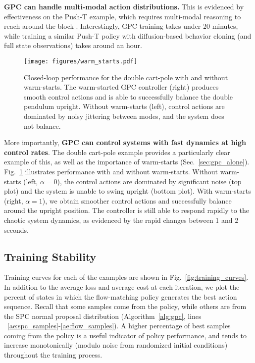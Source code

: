 \documentclass[letterpaper, 10 pt]{ieeeconf}
\begin{document}
\textbf{GPC can handle multi-modal action distributions.} This is evidenced by effectiveness on the Push-T example, which requires multi-modal reasoning to reach around the block \cite{chi2023diffusion}. Interestingly, GPC training takes under 20 minutes, while training a similar Push-T policy with diffusion-based behavior cloning (and full state observations) takes around an hour.

\begin{figure}
    \centering
    \texttt{[image: figures/warm\_starts.pdf]}
    \caption{Closed-loop performance for the double cart-pole with and without warm-starts. The warm-started GPC controller (right) produces smooth control actions and is able to successfully balance the double pendulum upright. Without warm-starts (left), control actions are dominated by noisy jittering between modes, and the system does not balance.}
    \label{fig:warm-starts}
\end{figure}

More importantly, \textbf{GPC can control systems with fast dynamics at high control rates}. The double cart-pole example provides a particularly clear example of this, as well as the importance of warm-starts (Sec.~\ref{sec:gpc_alone}). Fig.~\ref{fig:warm-starts} illustrates performance with and without warm-starts. Without warm-starts (left, $\alpha = 0$), the control actions are dominated by significant noise (top plot) and the system is unable to swing upright (bottom plot). With warm-starts (right, $\alpha = 1$), we obtain smoother control actions and successfully balance around the upright position. The controller is still able to respond rapidly to the chaotic system dynamics, as evidenced by the rapid changes between 1 and 2 seconds. 

\subsection{Training Stability}\label{sec:training_stability}

Training curves for each of the examples are shown in Fig.~\ref{fig:training_curves}. In addition to the average loss and average cost at each iteration, we plot the percent of states in which the flow-matching policy generates the best action sequence. Recall that some samples come from the policy, while others are from the SPC normal proposal distribution (Algorithm~\ref{alg:gpc}, lines ~\ref{ae:spc_samples}-\ref{ae:flow_samples}). A higher percentage of best samples coming from the policy is a useful indicator of policy performance, and tends to increase monotonically (modulo noise from randomized initial conditions) throughout the training process.
\end{document}
